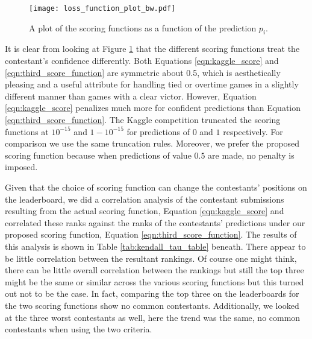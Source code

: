 \begin{figure}[H]
\centering
\texttt{[image: loss\_function\_plot\_bw.pdf]}
\caption{A plot of the scoring functions as a function of the prediction $p_i$.  }
\label{fig:scoring_functions}
\end{figure}

It is clear from looking at Figure \ref{fig:scoring_functions} that the different scoring functions treat the contestant's confidence differently. Both Equations \ref{eqn:kaggle_score} and \ref{eqn:third_score_function} are symmetric about 0.5, which is aesthetically pleasing and a useful attribute for handling tied or overtime games in a slightly different manner than games with a clear victor. However, Equation \ref{eqn:kaggle_score} penalizes much more for confident predictions than Equation \ref{eqn:third_score_function}. The Kaggle competition truncated the scoring functions at $10^{-15}$ and $1-10^{-15}$ for predictions of $0$ and $1$ respectively. For comparison we use the same truncation rules. Moreover, we prefer the proposed scoring function because when predictions of value $0.5$ are made, no penalty is imposed. 

%

Given that the choice of scoring function can change the contestants' positions on the leaderboard, we did a correlation analysis of the contestant submissions resulting from the actual scoring function, Equation \ref{eqn:kaggle_score} and correlated these ranks against the ranks of the contestants'  predictions under our proposed scoring function, Equation \ref{eqn:third_score_function}. The results of this analysis is shown in Table \ref{tab:kendall_tau_table} beneath. There appear to be little correlation between the resultant rankings. Of course one might think, there can be little overall correlation between the rankings but still the top three might be the same or similar across the various scoring functions but this turned out not to be the case. In fact, comparing the top three on the leaderboards for the two scoring functions show no common contestants. Additionally, we looked at the three worst contestants as well, here the trend was the same, no common contestants when using the two criteria. 

